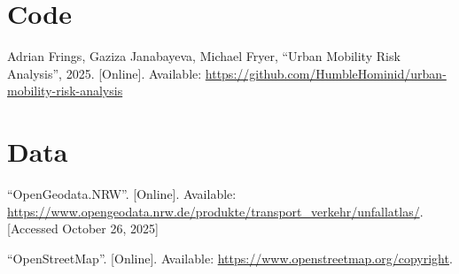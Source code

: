 \documentclass[10pt,a4paper]{article} %
\begin{document}
\section*{Code}
\begin{enumerate}[label={[\arabic*]},start=7]
    \item Adrian Frings, Gaziza Janabayeva, Michael Fryer, ``Urban Mobility Risk Analysis'', 2025. [Online]. Available: \url{https://github.com/HumbleHominid/urban-mobility-risk-analysis}
\end{enumerate}

\section*{Data}
\begin{enumerate}[label={[\arabic*]},start=8]
    \item ``OpenGeodata.NRW''. [Online]. Available: \url{https://www.opengeodata.nrw.de/produkte/transport_verkehr/unfallatlas/}. [Accessed October 26, 2025]
    \item ``OpenStreetMap''. [Online]. Available: \url{https://www.openstreetmap.org/copyright}.
\end{enumerate}

\end{document}
